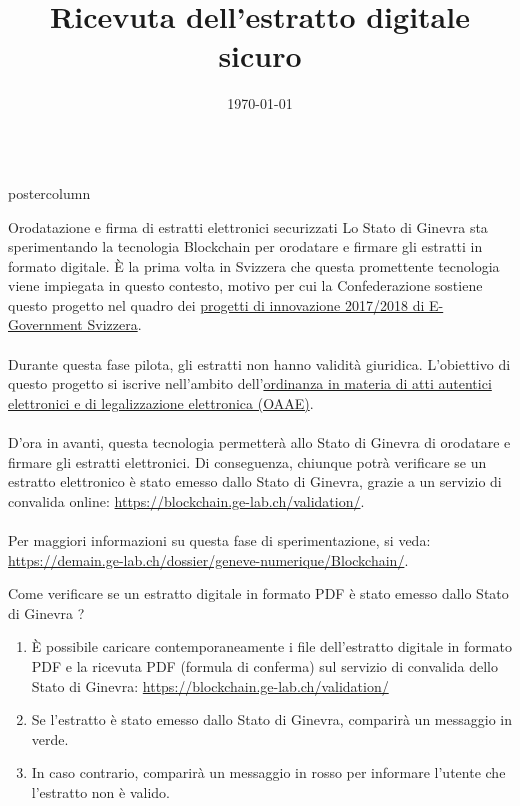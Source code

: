 \documentclass[roundedcorners=true, titleposition=center]{beamerthemeruhuisstijlposter}
\title{Ricevuta dell’estratto digitale sicuro}
\date{\today}
\begin{document}
\begin{frame}
\begin{columns}
\begin{column}{0.95\textwidth}
\begin{beamercolorbox}[center, wd=\textwidth]{postercolumn}
\begin{minipage}[T]{0.95\textwidth}
\parbox[t][\columnheight]{\textwidth}{%
\begin{block}{Orodatazione e firma di estratti elettronici securizzati}
    Lo Stato di Ginevra sta sperimentando la tecnologia Blockchain per orodatare e firmare gli estratti in formato digitale. È la prima volta in Svizzera che questa promettente tecnologia viene impiegata in questo contesto, motivo per cui la Confederazione sostiene questo progetto nel quadro dei \href{https://www.egovernment.ch/it/umsetzung/innovationen/innovazioni-20172018/}{progetti di innovazione 2017/2018 di E-Government Svizzera}.
\\
\\
Durante questa fase pilota, gli estratti non hanno validità giuridica. L’obiettivo di questo progetto si iscrive nell’ambito dell’\href{https://www.ejpd.admin.ch/ejpd/it/home/aktuell/news/2016/2016-09-07.html}{ordinanza in materia di atti autentici elettronici e di legalizzazione elettronica (OAAE)}.
\\
\\
D’ora in avanti, questa tecnologia permetterà allo Stato di Ginevra di orodatare e firmare gli estratti elettronici. Di conseguenza, chiunque potrà verificare se un estratto elettronico è stato emesso dallo Stato di Ginevra, grazie a un servizio di convalida online: \href{https://blockchain.ge-lab.ch/validation/}{https://blockchain.ge-lab.ch/validation/}.
\\
\\
Per maggiori informazioni su questa fase di sperimentazione, si veda: \href{https://demain.ge-lab.ch/dossier/geneve-numerique/Blockchain/}{https://demain.ge-lab.ch/dossier/geneve-numerique/Blockchain/}.
\end{block}
\medskip
\begin{block}{Come verificare se un estratto digitale in formato PDF è stato emesso dallo Stato di Ginevra ?}
\begin{enumerate}
\item È possibile caricare contemporaneamente i file dell’estratto digitale in formato PDF e la ricevuta PDF (formula di conferma) sul servizio di convalida dello Stato di Ginevra: \href{https://blockchain.ge-lab.ch/validation/}{https://blockchain.ge-lab.ch/validation/}
\item Se l’estratto è stato emesso dallo Stato di Ginevra, comparirà un messaggio in verde.
\item In caso contrario, comparirà un messaggio in rosso per informare l’utente che l’estratto non è valido.
\end{enumerate}
\end{block}
}
\end{minipage}
\end{beamercolorbox}
\end{column}
\end{columns}
\end{frame}
\end{document}
